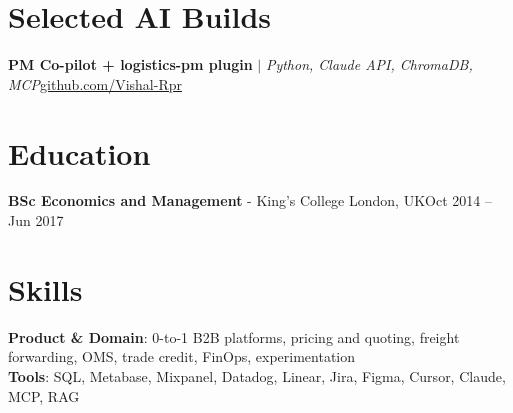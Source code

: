   \resumeSubHeadingListEnd

\section{Selected AI Builds}
  \resumeSubHeadingListStart
    \resumeProjectHeading
      {\textbf{PM Co-pilot + logistics-pm plugin} $|$ \emph{Python, Claude API, ChromaDB, MCP}}{\href{https://github.com/Vishal-Rpr}{\underline{github.com/Vishal-Rpr}}}
      \resumeItemListStart
      \resumeItemListEnd
  \resumeSubHeadingListEnd

\section{Education}
  \resumeSubHeadingListStart
    \resumeProjectHeading
      {\textbf{BSc Economics and Management} - King's College London, UK}{Oct 2014 -- Jun 2017}
  \resumeSubHeadingListEnd
\section{Skills}
 \begin{itemize}[leftmargin=0.15in, label={}]
    \small{\item{
     \textbf{Product \& Domain}{: 0-to-1 B2B platforms, pricing and quoting, freight forwarding, OMS, trade credit, FinOps, experimentation} \\
     \textbf{Tools}{: SQL, Metabase, Mixpanel, Datadog, Linear, Jira, Figma, Cursor, Claude, MCP, RAG} \\
    }}
 \end{itemize}


